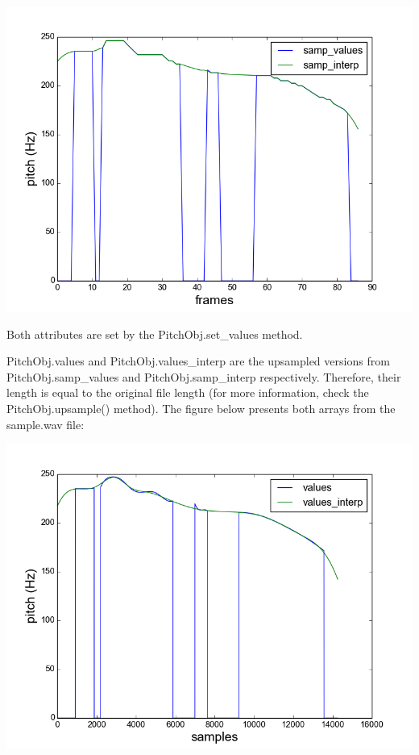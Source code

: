 \documentclass[letterpaper,10pt,english]{sphinxmanual}
\begin{document}
\includegraphics{samp_values.png}

Both attributes are set by the PitchObj.set\_values method.

\begin{fulllineitems}
\label{pYAAPT:PitchObj.values}\label{pYAAPT:PitchObj.values_interp}
PitchObj.values and PitchObj.values\_interp are the upsampled versions from PitchObj.samp\_values and PitchObj.samp\_interp respectively. Therefore, their length is equal to the original file length (for more information, check the PitchObj.upsample() method). The figure below presents both arrays from the sample.wav file:

\end{fulllineitems}


\includegraphics{values.png}
\end{document}
